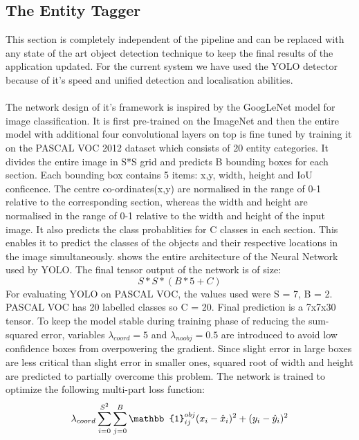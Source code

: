 \documentclass[conference]{IEEEtran}
\begin{document}
{    \subsection{The Entity Tagger}
        This section is completely independent of the pipeline and can be replaced with any state of the art object detection technique to keep the final results of the application updated. For the current system we have used the YOLO detector because of it's speed and unified detection and localisation abilities. \\ \\
        The network design of it's framework is inspired by the GoogLeNet model for image classification. It is first pre-trained on the ImageNet and then the entire model with additional four convolutional layers on top is fine tuned by training it on the PASCAL VOC 2012 \cite{pascal-voc-2012} dataset which consists of 20 entity categories. It divides the entire image in S*S grid and predicts B bounding boxes for each section. Each bounding box contains 5 items: x,y, width, height and IoU conficence. The centre co-ordinates(x,y) are normalised in the range of 0-1 relative to the corresponding section, whereas the width and height are normalised in the range of 0-1 relative to the width and height of the input image. It also predicts the class probablities for C classes in each section. This enables it to predict the classes of the objects and their respective locations in the image simultaneously.
        \cite{yolo} shows the entire architecture of the Neural Network used by YOLO.
        The final tensor output of the network is of size: 
        \begin{equation}
            S * S * ( B * 5 + C )
        \end{equation}
        For evaluating YOLO on PASCAL VOC, the values used were S = 7, B = 2. PASCAL VOC has 20 labelled classes so C = 20. Final prediction is a 7x7x30 tensor. To keep the model stable during training phase of reducing the sum-squared error, variables 
        $ \lambda _{coord} = 5$ and $ \lambda_{noobj} = 0.5 $
        are introduced to avoid low confidence boxes from overpowering the gradient. Since slight error in large boxes are less critical than slight error in smaller ones, squared root of width and height are predicted to partially overcome this problem. The network is trained to optimize the following multi-part loss function: \\
        \begin{equation}
        \lambda_{coord} \sum_{i=0}^{S^2} \sum_{j=0}^{B} \mathbb{1}_{ij}^{obj}(x_{i} - \hat x_{i})^{2} + (y_{i} - \hat y_{i})^{2} \\
        

\end{equation}}
\end{document}
